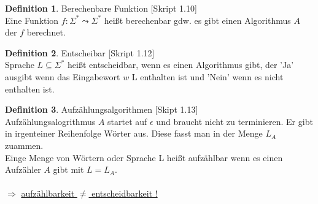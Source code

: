 \documentclass[a4paper, 10pt]{article}
\theoremstyle{definition}
\newtheorem{definition}{Definition}[section]
\newcommand{\kleene}{\Sigma^*}
\begin{document}
\begin{definition}{Berechenbare Funktion }[Skript 1.10]\\
Eine Funktion $f:\kleene\leadsto\kleene$ heißt berechenbar gdw. es gibt einen Algorithmus $A$ der $f$ berechnet.
\end{definition}
\begin{definition}{Entscheibar }[Skript 1.12]\\
Sprache $L\subseteq \kleene$ heißt entscheidbar, wenn es einen Algorithmus gibt, der 'Ja' ausgibt wenn das Eingabewort $w$ L enthalten ist und 'Nein' wenn es nicht enthalten ist.
\end{definition}
\begin{definition}{Aufzählungsalgorithmen }[Skipt 1.13]\\
Aufzählungsalogrithmus $A$ startet auf $\epsilon$ und braucht nicht zu terminieren. Er gibt in irgenteiner Reihenfolge Wörter aus. Diese fasst man in der Menge $L_A$ zuammen.\\
Einge Menge von Wörtern oder Sprache L heißt aufzählbar wenn es  einen Aufzähler $A$ gibt mit $L=L_A$.\\ \\
 
$\Rightarrow$ \underline{aufzählbarkeit $\neq$ entscheidbarkeit ! }

\end{definition}\newpage
\end{document}
